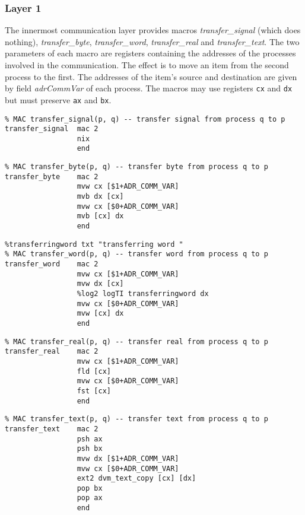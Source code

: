 \subsubsection{Layer 1}
The innermost communication layer provides macros \emph{transfer\_signal} (which does nothing), \emph{transfer\_byte}, \emph{transfer\_word}, \emph{transfer\_real} and \emph{transfer\_text}. The two parameters of each macro are registers containing the addresses of the processes involved in the communication. The effect is to move an item from the second process to the first. The addresses of the item's source and destination are given by field \emph{adrCommVar} of each process. The macros may use registers \texttt{cx} and \texttt{dx} but must preserve \texttt{ax} and \texttt{bx}.

{\small
\begin{verbatim}
% MAC transfer_signal(p, q) -- transfer signal from process q to p
transfer_signal  mac 2
                 nix
                 end
\end{verbatim}}

{\small
\begin{verbatim}
% MAC transfer_byte(p, q) -- transfer byte from process q to p
transfer_byte    mac 2
                 mvw cx [$1+ADR_COMM_VAR]
                 mvb dx [cx]
                 mvw cx [$0+ADR_COMM_VAR]
                 mvb [cx] dx
                 end
\end{verbatim}}

{\small
\begin{verbatim}
%transferringword txt "transferring word "
% MAC transfer_word(p, q) -- transfer word from process q to p
transfer_word    mac 2
                 mvw cx [$1+ADR_COMM_VAR]
                 mvw dx [cx]
                 %log2 logTI transferringword dx
                 mvw cx [$0+ADR_COMM_VAR]
                 mvw [cx] dx
                 end
\end{verbatim}}

{\small
\begin{verbatim}
% MAC transfer_real(p, q) -- transfer real from process q to p
transfer_real    mac 2
                 mvw cx [$1+ADR_COMM_VAR]
                 fld [cx]
                 mvw cx [$0+ADR_COMM_VAR]
                 fst [cx]
                 end
\end{verbatim}}

{\small
\begin{verbatim}
% MAC transfer_text(p, q) -- transfer text from process q to p
transfer_text    mac 2
                 psh ax
                 psh bx
                 mvw dx [$1+ADR_COMM_VAR]
                 mvw cx [$0+ADR_COMM_VAR]
                 ext2 dvm_text_copy [cx] [dx]
                 pop bx
                 pop ax
                 end
\end{verbatim}}


